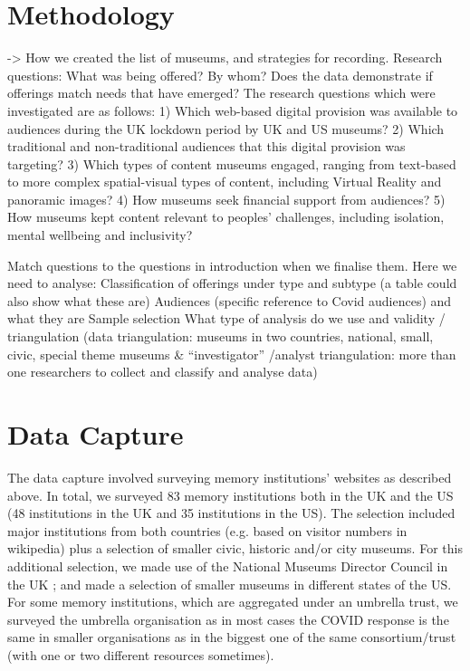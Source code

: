 \documentclass{egpubl}
\begin{document}
\section{Methodology}
-> How we created the list of museums, and strategies for recording.
Research questions:
What  was being offered? By whom?
Does the data demonstrate if offerings match needs that have emerged?
The research questions which were investigated are as follows:
1) Which web-based digital provision was available to audiences during the UK lockdown period by UK and US museums? 
2) Which traditional and non-traditional audiences that this digital provision was targeting?
3) Which types of content museums engaged, ranging from text-based to more complex spatial-visual types of content, including Virtual Reality and panoramic images?
4) How museums seek financial support from audiences?
5) How museums kept content relevant to peoples’ challenges, including isolation, mental wellbeing and inclusivity?

Match questions to the questions in introduction when we finalise them.
Here we need to analyse:
Classification of offerings under type and subtype (a table could also show what these are)
Audiences (specific reference to Covid audiences) and what they are
Sample selection 
What type of analysis do we use and validity / triangulation (data triangulation: museums in two countries, national, small, civic, special theme museums \& “investigator” /analyst  triangulation: more than one researchers to collect and classify and analyse data)


\section{Data Capture}
The data capture involved surveying memory institutions’ websites as described above. In total, we surveyed 83 memory institutions both in the UK and the US (48 institutions in the  UK and 35 institutions in the US). The selection included major institutions from both countries (e.g. based on visitor numbers in wikipedia) plus a selection of smaller civic, historic and/or city museums. For this additional selection, we made use of the National Museums Director Council in the UK \cite{nationalmuseums:2020}; and made a selection of smaller museums in different states of the US. For some memory institutions, which are aggregated under an umbrella trust, we surveyed the umbrella organisation as in most cases the COVID response is the same in smaller organisations as in the biggest one of the same consortium/trust (with one or two different resources sometimes).
\end{document}
